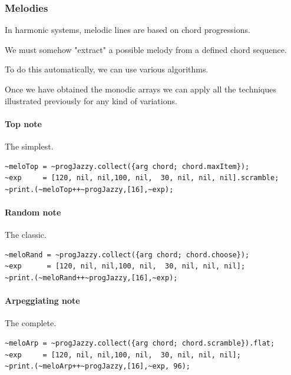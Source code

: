 \subsubsection{Melodies}\label{melodies}

In harmonic systems, melodic lines are based on chord progressions.

We must somehow "extract" a possible melody from a defined chord sequence.

To do this automatically, we can use various algorithms.

Once we have obtained the monodic arrays we can apply all the techniques illustrated previously for any kind of variations.

\paragraph{Top note}\label{top-note}
The simplest.

\begin{lstlisting}[frame=single, caption=top note melody model function] 
~meloTop = ~progJazzy.collect({arg chord; chord.maxItem});
~exp     = [120, nil, nil,100, nil,  30, nil, nil, nil].scramble;
~print.(~meloTop++~progJazzy,[16],~exp);
\end{lstlisting}

\paragraph{Random note}\label{random-note}
The classic.

\begin{lstlisting}[frame=single, caption=random note melody model function] 
~meloRand = ~progJazzy.collect({arg chord; chord.choose});
~exp      = [120, nil, nil,100, nil,  30, nil, nil, nil];
~print.(~meloRand++~progJazzy,[16],~exp);
\end{lstlisting}

\paragraph{Arpeggiating note}\label{arpeggiating-note}
The complete.

\begin{lstlisting}[frame=single, caption=arpeggiating note melody model function] 
~meloArp = ~progJazzy.collect({arg chord; chord.scramble}).flat; 
~exp     = [120, nil, nil,100, nil,  30, nil, nil, nil];
~print.(~meloArp++~progJazzy,[16],~exp, 96);
\end{lstlisting}

